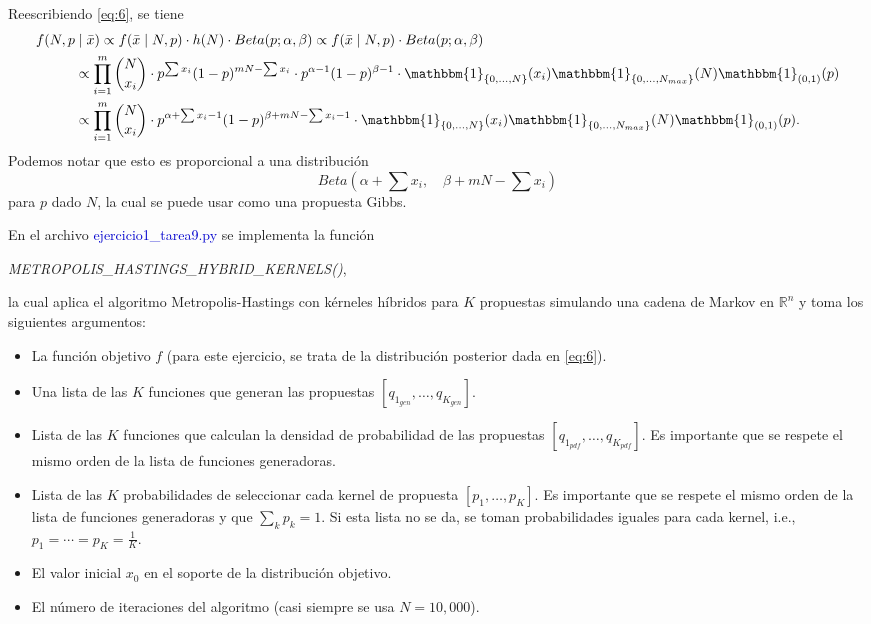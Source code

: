 Reescribiendo \eqref{eq:6}, se tiene
\begin{equation}\label{eq:7}
	\begin{aligned}
		f(N, p &\mid \bar{x}) \propto f(\bar{x} \mid N, p) \cdot h(N) \cdot Beta (p; \alpha, \beta) \propto  f(\bar{x} \mid N, p) \cdot Beta (p; \alpha, \beta)\\
		& \propto \prod_{i=1}^m \binom{N}{x_i} \cdot p^{\sum x_i} (1-p)^{mN - \sum x_i} \cdot  p^{\alpha - 1} (1-p)^{\beta - 1} \cdot \mathbbm{1}_{\{0,\dots,N\}} (x_i) \mathbbm{1}_{\{0,\dots,N_{max}\}} (N) \mathbbm{1}_{(0,1)} (p)\\
		& \propto \prod_{i=1}^m \binom{N}{x_i} \cdot p^{\alpha + \sum x_i - 1} (1-p)^{\beta + mN - \sum x_i - 1} \cdot \mathbbm{1}_{\{0,\dots,N\}} (x_i) \mathbbm{1}_{\{0,\dots,N_{max}\}} (N) \mathbbm{1}_{(0,1)} (p).
	\end{aligned}
\end{equation}
Podemos notar que esto es proporcional a una distribución
\begin{equation} \label{eq:8}
	Beta \left(\alpha + \sum x_i, \quad \beta + mN - \sum x_i  \right)
\end{equation}
para $p$ dado $N$, la cual se puede usar como una propuesta Gibbs.

\newpage
En el archivo \textcolor{mediumblue}{ejercicio1\_tarea9.py} se implementa la función 
\begin{center}
	\textit{METROPOLIS\_HASTINGS\_HYBRID\_KERNELS()},
\end{center}
la cual aplica el algoritmo Metropolis-Hastings con kérneles híbridos para $K$ propuestas simulando una cadena de Markov en $\mathbb{R}^n$ y toma los siguientes argumentos:
\begin{itemize}
	\item La función objetivo $f$ (para este ejercicio, se trata de la distribución posterior dada en \eqref{eq:6}).
	\item Una lista de las $K$ funciones que generan las propuestas $[q_{1_{gen}}, \dots, q_{K_{gen}}]$.
	\item Lista de las $K$ funciones que calculan la densidad de probabilidad de las propuestas $[q_{1_{pdf}}, \dots, q_{K_{pdf}}]$. Es importante que se respete el mismo orden de la lista de funciones generadoras.
	\item Lista de las $K$ probabilidades de seleccionar cada kernel de propuesta $[p_1,\dots,p_{K}]$. Es importante que se respete el mismo orden de la lista de funciones generadoras y que $\sum_{k} p_k =1$. Si esta lista no se da, se toman probabilidades iguales para cada kernel, i.e., $p_1=\cdots = p_K = \frac{1}{K}$.
	\item El valor inicial $x_0$ en el soporte de la distribución objetivo.
	\item El número de iteraciones del algoritmo (casi siempre se usa $N = 10,000$).
\end{itemize}

